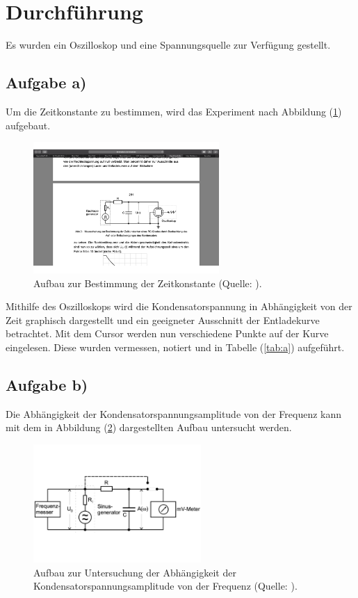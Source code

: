 \section{Durchführung}
Es wurden ein Oszilloskop und eine Spannungsquelle zur Verfügung gestellt.

\subsection{Aufgabe a)}
Um die Zeitkonstante zu bestimmen, wird das Experiment nach Abbildung (\ref{fig:rcaa}) aufgebaut.

\begin{figure}
            \centering
               \includegraphics[height=5cm]{rcaa.pdf}
               \caption{Aufbau zur Bestimmung der Zeitkonstante (Quelle: \cite{V353}).}
               \label{fig:rcaa}
\end{figure}

\noindent
Mithilfe des Oszilloskops wird die Kondensatorspannung in Abhängigkeit von der Zeit graphisch dargestellt und ein geeigneter Ausschnitt der Entladekurve betrachtet.
Mit dem Cursor werden nun verschiedene Punkte auf der Kurve eingelesen.
Diese wurden vermessen, notiert und in Tabelle (\ref{tab:a}) aufgeführt.

\subsection{Aufgabe b)}
Die Abhängigkeit der Kondensatorspannungsamplitude von der Frequenz kann mit dem in Abbildung (\ref{fig:rcab}) dargestellten Aufbau untersucht werden.

\begin{figure}
            \centering
               \includegraphics[height=4.5cm]{rcab.pdf}
               \caption{Aufbau zur Untersuchung der Abhängigkeit der Kondensatorspannungsamplitude von der Frequenz (Quelle: \cite{V353}).}
               \label{fig:rcab}
\end{figure}


